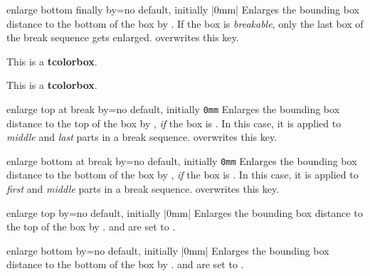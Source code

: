 \begin{docTcbKey}{enlarge bottom finally by}{=}{no default, initially |0mm|}
  Enlarges the bounding box distance to the bottom of the box by .
  If the box is \emph{breakable}, only the last box of the break sequence
  gets enlarged.  overwrites this key.
\begin{dispExample}

\begin{tcolorbox}[enlarge bottom finally by=5mm]
This is a \textbf{tcolorbox}.
\end{tcolorbox}
\begin{tcolorbox}[enlarge bottom finally by=-5mm,enhanced,show bounding box]
This is a \textbf{tcolorbox}.
\end{tcolorbox}
\end{dispExample}
\end{docTcbKey}

\clearpage


\begin{docTcbKey}{enlarge top at break by}{=}{no default, initially \texttt{0mm}}
  Enlarges the bounding box distance to the top of the box by ,
  \emph{if} the box is .
  In this case, it is applied to \emph{middle} and \emph{last} parts in a
  break sequence.
   overwrites this key.
\end{docTcbKey}


\begin{docTcbKey}{enlarge bottom at break by}{=}{no default, initially \texttt{0mm}}
  Enlarges the bounding box distance to the bottom of the box by ,
  \emph{if} the box is .
  In this case, it is applied to \emph{first} and \emph{middle} parts in a
  break sequence.  overwrites this key.
\end{docTcbKey}


\begin{docTcbKey}{enlarge top by}{=}{no default, initially |0mm|}
  Enlarges the bounding box distance to the top of the box by .
   and
   are set to .
\end{docTcbKey}


\begin{docTcbKey}{enlarge bottom by}{=}{no default, initially |0mm|}
  Enlarges the bounding box distance to the bottom of the box by .
   and
   are set to .
\end{docTcbKey}


